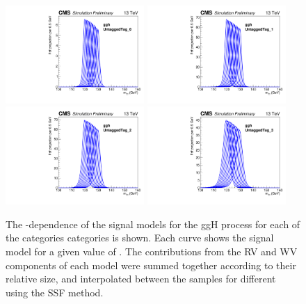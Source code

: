 \begin{figure}[ht!]
\centering
\includegraphics[width=0.47\textwidth]{modellingFigures/DCBpG/ggh_UntaggedTag_0_fmc_interp.pdf} 
\includegraphics[width=0.47\textwidth]{modellingFigures/DCBpG/ggh_UntaggedTag_1_fmc_interp.pdf} \\ 
\includegraphics[width=0.47\textwidth]{modellingFigures/DCBpG/ggh_UntaggedTag_2_fmc_interp.pdf} 
\includegraphics[width=0.47\textwidth]{modellingFigures/DCBpG/ggh_UntaggedTag_3_fmc_interp.pdf} \\
\caption{The \mH-dependence of the signal models for the ggH process for each of the \Untagged categories categories is shown. Each curve shows the signal model for a given value of \mH. The contributions from the RV and WV components of each model were summed together according to their relative size, and interpolated between the samples for different \mH using the SSF method.}

\label{fig:model:sig_interpolation}
\end{figure}

